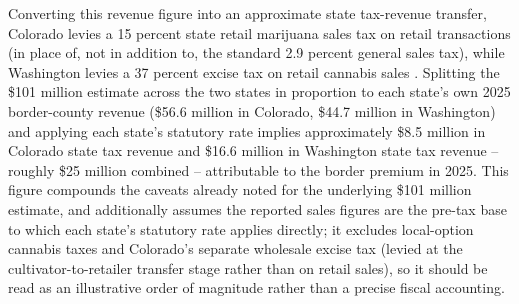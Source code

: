\documentclass[12pt]{article}
\begin{document}
Converting this revenue figure into an approximate state tax-revenue transfer, Colorado levies a 15 percent
state retail marijuana sales tax on retail transactions (in place of, not in addition to, the standard 2.9
percent general sales tax), while Washington levies a 37 percent excise tax on retail cannabis sales
\citep{CDORMarijuanaSalesTax,WADORCannabisRetailers}. Splitting the \$101 million estimate across the two
states in proportion to each state's own 2025 border-county revenue (\$56.6 million in Colorado, \$44.7
million in Washington) and applying each state's statutory rate implies approximately \$8.5 million in
Colorado state tax revenue and \$16.6 million in Washington state tax revenue -- roughly \$25 million
combined -- attributable to the border premium in 2025. This figure compounds the caveats already noted for
the underlying \$101 million estimate, and additionally assumes the reported sales figures are the pre-tax
base to which each state's statutory rate applies directly; it excludes local-option cannabis taxes and
Colorado's separate wholesale excise tax (levied at the cultivator-to-retailer transfer stage rather than on
retail sales), so it should be read as an illustrative order of magnitude rather than a precise fiscal
accounting.

\newpage


\end{document}
